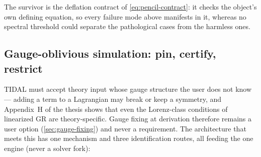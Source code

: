 The survivor is the deflation contract of \cref{eq:pencil-contract}: it
checks the object's own defining equation, so every failure mode above
manifests in it, whereas no spectral threshold could separate the
pathological cases from the harmless ones.

\subsection{Gauge-oblivious simulation: pin, certify, restrict}
\label{sec:pencil-general-input}

TIDAL must accept theory input whose gauge structure the user does not
know --- adding a term to a Lagrangian may break or keep a symmetry, and
Appendix~H of the thesis shows that even the Lorenz-class conditions of
linearized GR are theory-specific. Gauge fixing at derivation therefore
remains a user option (\cref{sec:gauge-fixing}) and never a requirement.
The architecture that meets this has one mechanism and three
identification routes, all feeding the one engine (never a solver fork):

